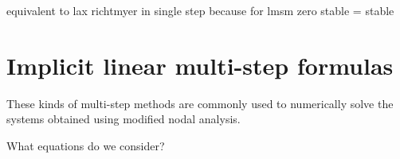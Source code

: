 	equivalent to lax richtmyer in single step because for lmsm zero stable = stable
	

\section{Implicit linear multi-step formulas}
These kinds of multi-step methods are commonly used to numerically solve the systems obtained using modified nodal analysis.

What equations do we consider?

%

